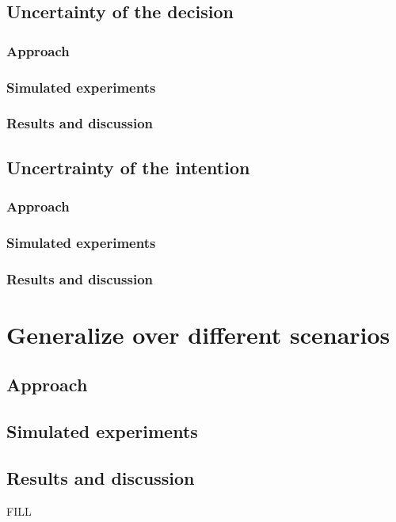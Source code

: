 \section{Uncertainty of the decision}
\subsection{Approach}
\subsection{Simulated experiments}
\subsection{Results and discussion}

\section{Uncertrainty of the intention}
\subsection{Approach}
\subsection{Simulated experiments}
\subsection{Results and discussion}


\chapter{Generalize over different scenarios}
\section{Approach}
\section{Simulated experiments}
\section{Results and discussion}
FILL